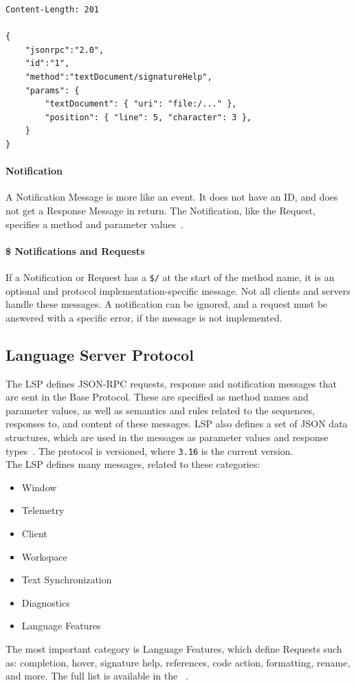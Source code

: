 \begin{lstlisting}[caption={A Request Message Example}, label={lst:lsp-example}]
Content-Length: 201

{
    "jsonrpc":"2.0",
    "id":"1",
    "method":"textDocument/signatureHelp",
    "params": {
        "textDocument": { "uri": "file:/..." },
        "position": { "line": 5, "character": 3 },
    }
}
\end{lstlisting}


\paragraph{Notification}
A Notification Message is more like an event.
It does not have an ID, and does not get a Response Message in return.
The Notification, like the Request, specifies a method and parameter values~\cite{microsoftLanguageServerProtocol2021}.

\paragraph{\$ Notifications and Requests}
If a Notification or Request has a \lstinline{$/} at the start of the method name, it is an optional and protocol implementation-specific message.
Not all clients and servers handle these messages.
A notification can be ignored, and a request must be answered with a specific error, if the message is not implemented.

\subsection{Language Server Protocol}
The \acrfull{LSP} defines \gls{JSON-RPC} requests, response and notification messages that are sent in the Base Protocol.
These are specified as method names and parameter values, as well as semantics and rules related to the sequences, responses to, and content of these messages.
\acrshort{LSP} also defines a set of \gls{JSON} data structures, which are used in the messages as parameter values and response types~\cite{microsoftLanguageServerProtocol2021}.
The protocol is versioned, where \texttt{3.16} is the current version.\\

The \acrshort{LSP} defines many messages, related to these categories: 
\begin{itemize}
  \item Window
  \item Telemetry
  \item Client
  \item Workspace
  \item Text Synchronization
  \item Diagnostics
  \item Language Features
\end{itemize}
The most important category is Language Features, which define Requests such as: completion, hover, signature help, references, code action, formatting, rename, and more.
The full list is available in the ~\cite{microsoftLanguageServerProtocol2021}.
